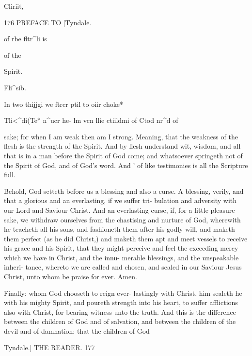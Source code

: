 \documentclass{custom}
\begin{document}
Cliriit, 



176
PREFACE TO 
[Tyndale. 



of rbe 
fltr^li is 

of the 

Spirit. 

Fli^sib. 



In two 
thijjgi we 
ftrcr ptil to 
oiir choke* 



Tli<^di(Te* 
n^ucr he- 
lm vcn llie 
ctiildmi of 
Ctod nr^d of 




sake; for when I am weak then am I strong. 
Meaning, that the weakness of the flesh is the 
strength of the Spirit. And by flesh understand
wit, wisdom, and all that is in a man before the 
Spirit of God come; and whatsoever springeth 
not of the Spirit of God, and of God's word. And ' 
of like testimonies is all the Scripture full.

Behold, God setteth before us a blessing and 
also a curse. A blessing, verily, and that a 
glorious and an everlasting, if we suffer tri- 
bulation and adversity with our Lord and Saviour 
Christ. And an everlasting curse, if, for a little 
pleasure sake, we withdraw ourselves from the 
chastising and nurture of God, wherewith he 
teacheth all his sons, and fashioneth them after 
his godly will, and maketh them perfect (as he 
did Christ,) and maketh them apt and meet 
vessels to receive his grace and his Spirit, that 
they might perceive and feel the exceeding 
mercy which we have in Christ, and the innu- 
merable blessings, and the unspeakable inheri- 
tance, whereto we are called and chosen, and 
sealed in our Saviour Jesus Christ, unto whom 
be praise for ever. Amen. 

Finally: whom God chooseth to reign ever- 
lastingly with Christ, him sealeth he with his 
mighty Spirit, and poureth strength into his 
heart, to suffer afflictions also with Christ, for 
bearing witness unto the truth. And this is the 
difference between the children of God and of 
salvation, and between the children of the devil 
and of damnation: that the children of God


Tyndale.] THE READER. 177 
\end{document}
